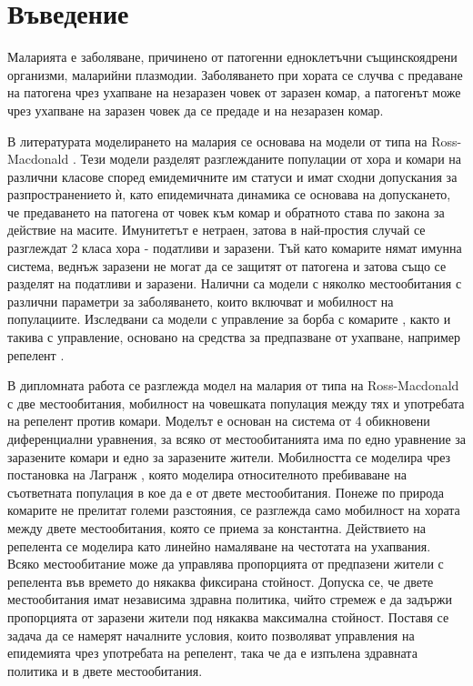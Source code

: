 \section{Въведение}
Маларията е заболяване, причинено от патогенни едноклетъчни същинскоядрени организми, маларийни плазмодии.
Заболяването при хората се случва с предаване на патогена чрез ухапване на незаразен човек от заразен комар, а патогенът може чрез ухапване на заразен човек да се предаде и на незаразен комар.

В литературата моделирането на малария се основава на модели от типа на Ross-Macdonald \cite{Smith2012}.
Тези модели разделят разглежданите популации от хора и комари на различни класове според емидемичните им статуси и имат сходни допускания за разпространението ѝ, като епидемичната динамика се основава на допускането, че предаването на патогена от човек към комар и обратното става по закона за действие на масите.
Имунитетът е нетраен, затова в най-простия случай се разглеждат 2 класа хора - податливи и заразени.
Тъй като комарите нямат имунна система, веднъж заразени не могат да се защитят от патогена и затова също се разделят на податливи и заразени.
Налични са модели \cite{Cosner2009, Ruktanonchai2016, Bichara2016, Agusto2021} с няколко местообитания с различни параметри за заболяването, които включват и мобилност на популациите.
Изследвани са модели с управление за борба с комарите \cite{DeLara2016}, както и такива с управление, основано на средства за предпазване от ухапване, например репелент \cite{Rashkov2022, Rashkov2021}.

В дипломната работа се разглежда модел на малария от типа на Ross-Macdonald с две местообитания, мобилност на човешката популация между тях и употребата на репелент против комари.
Моделът е основан на система от 4 обикновени диференциални уравнения, за всяко от местообитанията има по едно уравнение за заразените комари и едно за заразените жители.
Мобилността се моделира чрез постановка на Лагранж \cite{Cosner2009}, която моделира относителното пребиваване на съответната популация в кое да е от двете местообитания.
Понеже по природа комарите не прелитат големи разстояния, се разглежда само мобилност на хората между двете местообитания, която се приема за константна.
Действието на репелента се моделира като линейно намаляване на честотата на ухапвания.
Всяко местообитание може да управлява пропорцията от предпазени жители с репелента във времето до някаква фиксирана стойност.
Допуска се, че двете местообитания имат независима здравна политика, чийто стремеж е да задържи пропорцията от заразени жители под някаква максимална стойност.
Поставя се задача да се намерят началните условия, които позволяват управления на епидемията чрез употребата на репелент, така че да е изпълена здравната политика и в двете местообитания.
